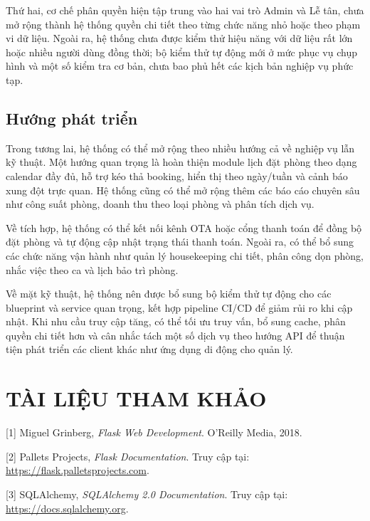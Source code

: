\documentclass[13pt,a4paper]{extreport}
\begin{document}
Thứ hai, cơ chế phân quyền hiện tập trung vào hai vai trò Admin và Lễ tân, chưa mở rộng thành hệ thống quyền chi tiết theo từng chức năng nhỏ hoặc theo phạm vi dữ liệu. Ngoài ra, hệ thống chưa được kiểm thử hiệu năng với dữ liệu rất lớn hoặc nhiều người dùng đồng thời; bộ kiểm thử tự động mới ở mức phục vụ chụp hình và một số kiểm tra cơ bản, chưa bao phủ hết các kịch bản nghiệp vụ phức tạp.

\section{Hướng phát triển}

Trong tương lai, hệ thống có thể mở rộng theo nhiều hướng cả về nghiệp vụ lẫn kỹ thuật. Một hướng quan trọng là hoàn thiện module lịch đặt phòng theo dạng calendar đầy đủ, hỗ trợ kéo thả booking, hiển thị theo ngày/tuần và cảnh báo xung đột trực quan. Hệ thống cũng có thể mở rộng thêm các báo cáo chuyên sâu như công suất phòng, doanh thu theo loại phòng và phân tích dịch vụ.

Về tích hợp, hệ thống có thể kết nối kênh OTA hoặc cổng thanh toán để đồng bộ đặt phòng và tự động cập nhật trạng thái thanh toán. Ngoài ra, có thể bổ sung các chức năng vận hành như quản lý housekeeping chi tiết, phân công dọn phòng, nhắc việc theo ca và lịch bảo trì phòng.

Về mặt kỹ thuật, hệ thống nên được bổ sung bộ kiểm thử tự động cho các blueprint và service quan trọng, kết hợp pipeline CI/CD để giảm rủi ro khi cập nhật. Khi nhu cầu truy cập tăng, có thể tối ưu truy vấn, bổ sung cache, phân quyền chi tiết hơn và cân nhắc tách một số dịch vụ theo hướng API để thuận tiện phát triển các client khác như ứng dụng di động cho quản lý.

\clearpage
\chapter*{TÀI LIỆU THAM KHẢO}

[1] Miguel Grinberg, \emph{Flask Web Development}. O'Reilly Media, 2018.
 
[2] Pallets Projects, \emph{Flask Documentation}.  
Truy cập tại: \href{https://flask.palletsprojects.com}{https://flask.palletsprojects.com}.
 
[3] SQLAlchemy, \emph{SQLAlchemy 2.0 Documentation}.  
Truy cập tại: \href{https://docs.sqlalchemy.org}{https://docs.sqlalchemy.org}.
 
\end{document}
